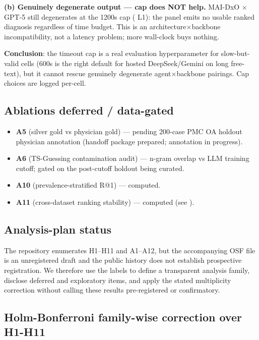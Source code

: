 \textbf{(b) Genuinely degenerate output --- cap does NOT help.} MAI-DxO \ensuremath{\times} GPT-5
still degenerates at the 1200s cap ( L1): the panel emits no usable
ranked diagnosis regardless of time budget. This is an architecture\ensuremath{\times}backbone
incompatibility, not a latency problem; more wall-clock buys nothing.

\textbf{Conclusion}: the timeout cap is a real evaluation hyperparameter for
slow-but-valid cells (600s is the right default for hosted DeepSeek/Gemini
on long free-text), but it cannot rescue genuinely degenerate
agent\ensuremath{\times}backbone pairings. Cap choices are logged per-cell.

\subsection{Ablations deferred / data-gated}\label{sec-8-7}

\begin{itemize}
\tightlist
\item
  \textbf{A5} (silver gold vs physician gold) --- pending 200-case PMC OA
  holdout physician annotation (handoff package prepared; annotation in
  progress).
\item
  \textbf{A6} (TS-Guessing contamination audit) --- n-gram overlap vs LLM
  training cutoff; gated on the post-cutoff holdout being curated.
\item
  \textbf{A10} (prevalence-stratified R@1) --- computed.
\item
  \textbf{A11} (cross-dataset ranking stability) --- computed (see ).
\end{itemize}

\subsection{Analysis-plan status}\label{sec-8-5}

The repository enumerates H1--H11 and A1--A12, but the accompanying OSF
file is an unregistered draft and the public history does not establish
prospective registration. We therefore use the labels to define a transparent
analysis family, disclose deferred and exploratory items, and apply the stated
multiplicity correction without calling these results pre-registered or
confirmatory.

\subsection{Holm-Bonferroni family-wise correction over H1-H11}\label{sec-8-8}

